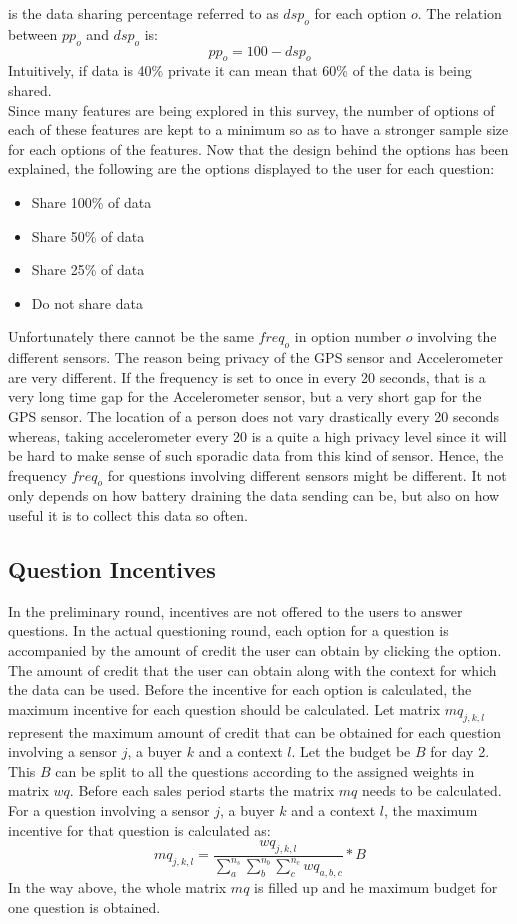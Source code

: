 is the data sharing percentage referred to as $dsp_o$ for each option $o$. The relation between $pp_o$ and $dsp_o$ is:
$$pp_o = 100 - dsp_o$$
Intuitively, if data is 40\% private it can mean that 60\% of the data is being shared.\\
Since many features are being explored in this survey, the number of options of each of these features are kept to a minimum so as to have a stronger
sample size for each options of the features. Now that the design behind the options has been explained, the following are the options displayed to the user for each question:
\begin{itemize}
\item Share 100\% of data
\item Share 50\% of data
\item Share 25\% of data
\item Do not share data

\end{itemize}

Unfortunately there cannot be the same $freq_o$ in option number $o$ involving the different sensors. The reason being privacy of the GPS sensor and Accelerometer are very different. If the frequency is set to  once in every 20 seconds, that is a very long time gap for the Accelerometer sensor, but a very short gap for the GPS sensor. The location of a person does not vary drastically every 20 seconds whereas, taking accelerometer every 20 is a quite a high privacy level since it will be hard to make sense of such sporadic data from this kind of sensor. Hence, the frequency $freq_o$ for questions involving different sensors might be different. It not only depends on how battery
draining the data sending can be, but also on how useful it is to collect this data so often.


\subsection{Question Incentives}
In the preliminary round, incentives are not offered to the users to answer questions. In the actual questioning round, each option for a question is accompanied
by the amount of credit the user can obtain by clicking the option. The amount of credit that the user can obtain along with the context for which the data can be used.
Before the incentive for each option is calculated, the maximum incentive for each question should be calculated. Let matrix $mq_{j,k,l}$ represent the maximum amount of
credit that can be obtained for each question involving a sensor $j$, a buyer $k$ and a context $l$. Let the budget be $B$ for day 2. This $B$ can be split
to all the questions according to the assigned weights in matrix $wq$. Before each sales period starts the matrix $mq$ needs to be calculated. For a question
involving a sensor $j$, a buyer $k$ and a context $l$, the maximum incentive for that question is calculated as:
$$mq_{j,k,l} = \frac{wq_{j,k,l}}{\sum^{n_s}_a \sum^{n_b}_b \sum^{n_c}_c wq_{a,b,c}}*B$$
In the way above, the whole matrix $mq$ is filled up and he maximum budget for one question is obtained.

